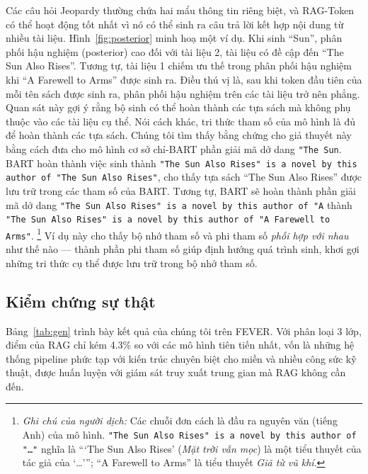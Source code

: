 \documentclass[10pt,letterpaper]{article}
\newcommand{\gen}[1]{\texttt{#1}}
\newcounter{tnote}
\newcommand{\tnote}[1]{\stepcounter{tnote}%
  {\renewcommand{\thefootnote}{\roman{tnote}}%
   \footnote[\value{tnote}]{\textit{Ghi chú của người dịch:} #1}}}
\begin{document}
Các câu hỏi Jeopardy thường chứa hai mẩu thông tin riêng biệt, và RAG-Token có
thể hoạt động tốt nhất vì nó có thể sinh ra câu trả lời kết hợp nội dung từ
nhiều tài liệu. Hình~\ref{fig:posterior} minh hoạ một ví dụ. Khi sinh ``Sun'',
phân phối hậu nghiệm (posterior) cao đối với tài liệu 2, tài liệu có đề cập đến
``The Sun Also Rises''. Tương tự, tài liệu 1 chiếm ưu thế trong phân phối hậu
nghiệm khi ``A Farewell to Arms'' được sinh ra. Điều thú vị là, sau khi token
đầu tiên của mỗi tên sách được sinh ra, phân phối hậu nghiệm trên các tài liệu
trở nên phẳng. Quan sát này gợi ý rằng bộ sinh có thể hoàn thành các tựa sách
mà không phụ thuộc vào các tài liệu cụ thể. Nói cách khác, tri thức tham số của
mô hình là đủ để hoàn thành các tựa sách. Chúng tôi tìm thấy bằng chứng cho giả
thuyết này bằng cách đưa cho mô hình cơ sở chỉ-BART phần giải mã dở dang
\gen{"The Sun}. BART hoàn thành việc sinh thành \gen{"The Sun Also Rises" is a
novel by this author of "The Sun Also Rises"}, cho thấy tựa sách ``The Sun Also
Rises'' được lưu trữ trong các tham số của BART. Tương tự, BART sẽ hoàn thành
phần giải mã dở dang \gen{"The Sun Also Rises" is a novel by this author of "A}
thành \gen{"The Sun Also Rises" is a novel by this author of "A Farewell to
Arms"}.\tnote{Các chuỗi đơn cách là đầu ra nguyên văn (tiếng Anh) của mô hình.
\gen{"The Sun Also Rises" is a novel by this author of "\ldots"} nghĩa là
``‘The Sun Also Rises’ (\emph{Mặt trời vẫn mọc}) là một tiểu thuyết của tác giả
của ‘\ldots’''; ``A Farewell to Arms'' là tiểu thuyết \emph{Giã từ vũ khí}.} Ví
dụ này cho thấy bộ nhớ tham số và phi tham số \emph{phối hợp với nhau} như thế
nào --- thành phần phi tham số giúp định hướng quá trình sinh, khơi gợi những
tri thức cụ thể được lưu trữ trong bộ nhớ tham số.

\subsection{Kiểm chứng sự thật}

Bảng~\ref{tab:gen} trình bày kết quả của chúng tôi trên FEVER. Với phân loại 3
lớp, điểm của RAG chỉ kém 4.3\% so với các mô hình tiên tiến nhất, vốn là những
hệ thống pipeline phức tạp với kiến trúc chuyên biệt cho miền và nhiều công sức
kỹ thuật, được huấn luyện với giám sát truy xuất trung gian mà RAG không cần
đến.
\end{document}
